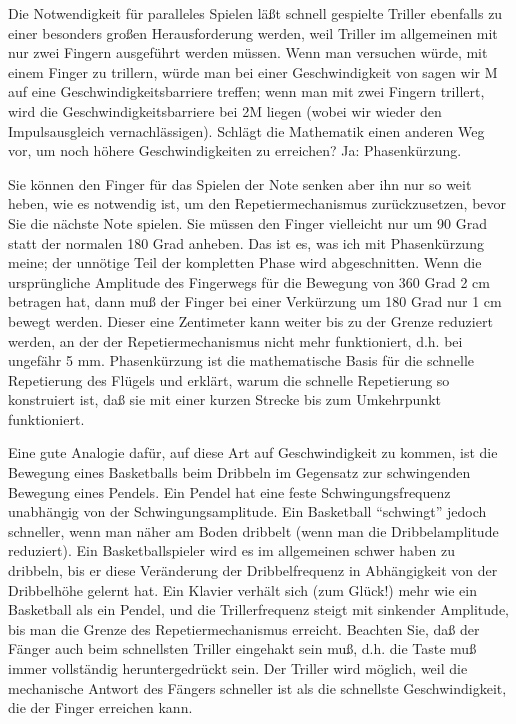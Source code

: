 Die Notwendigkeit für paralleles Spielen läßt schnell gespielte Triller ebenfalls zu einer besonders großen Herausforderung werden, weil Triller im allgemeinen mit nur zwei Fingern ausgeführt werden müssen.
Wenn man versuchen würde, mit einem Finger zu trillern, würde man bei einer Geschwindigkeit von sagen wir M auf eine Geschwindigkeitsbarriere treffen; wenn man mit zwei Fingern trillert, wird die Geschwindigkeitsbarriere bei 2M liegen (wobei wir wieder den Impulsausgleich vernachlässigen).
Schlägt die Mathematik einen anderen Weg vor, um noch höhere Geschwindigkeiten zu erreichen?
Ja: Phasenkürzung.

Sie können den Finger für das Spielen der Note senken aber ihn nur so weit heben, wie es notwendig ist, um den Repetiermechanismus zurückzusetzen, bevor Sie die nächste Note spielen.
Sie müssen den Finger vielleicht nur um 90 Grad statt der normalen 180 Grad anheben.
Das ist es, was ich mit Phasenkürzung meine; der unnötige Teil der kompletten Phase wird abgeschnitten.
Wenn die ursprüngliche Amplitude des Fingerwegs für die Bewegung von 360 Grad 2 cm betragen hat, dann muß der Finger bei einer Verkürzung um 180 Grad nur 1 cm bewegt werden.
Dieser eine Zentimeter kann weiter bis zu der Grenze reduziert werden, an der der Repetiermechanismus nicht mehr funktioniert, d.h. bei ungefähr 5 mm.
Phasenkürzung ist die mathematische Basis für die schnelle Repetierung des Flügels und erklärt, warum die schnelle Repetierung so konstruiert ist, daß sie mit einer kurzen Strecke bis zum Umkehrpunkt funktioniert.

Eine gute Analogie dafür, auf diese Art auf Geschwindigkeit zu kommen, ist die Bewegung eines Basketballs beim Dribbeln im Gegensatz zur schwingenden Bewegung eines Pendels.
Ein Pendel hat eine feste Schwingungsfrequenz unabhängig von der Schwingungsamplitude.
Ein Basketball \enquote{schwingt} jedoch schneller, wenn man näher am Boden dribbelt (wenn man die Dribbelamplitude reduziert).
Ein Basketballspieler wird es im allgemeinen schwer haben zu dribbeln, bis er diese Veränderung der Dribbelfrequenz in Abhängigkeit von der Dribbelhöhe gelernt hat.
Ein Klavier verhält sich (zum Glück!) mehr wie ein Basketball als ein Pendel, und die Trillerfrequenz steigt mit sinkender Amplitude, bis man die Grenze des Repetiermechanismus erreicht.
Beachten Sie, daß der Fänger auch beim schnellsten Triller eingehakt sein muß, d.h. die Taste muß immer vollständig heruntergedrückt sein.
Der Triller wird möglich, weil die mechanische Antwort des Fängers schneller ist als die schnellste Geschwindigkeit, die der Finger erreichen kann.

